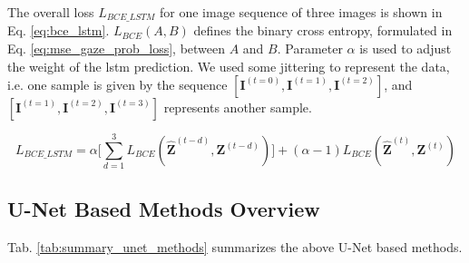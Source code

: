 The overall loss $L_{BCE\_LSTM}$ for one image sequence of three images is shown in Eq. \ref{eq:bce_lstm}.
$L_{BCE}(A,B)$ defines the binary cross entropy, formulated in Eq. \ref{eq:mse_gaze_prob_loss}, between $A$ and $B$.
Parameter $\alpha$ is used to adjust the weight of the \gls{lstm} prediction.
We used some jittering to represent the data, i.e. one sample is given by the sequence $[\boldsymbol{I}^{(t=0)}, \boldsymbol{I}^{(t=1)}, \boldsymbol{I}^{(t=2)}]$, and $[\boldsymbol{I}^{(t=1)}, \boldsymbol{I}^{(t=2)}, \boldsymbol{I}^{(t=3)}]$ represents another sample.

\begin{equation}
L_{BCE\_LSTM} = \alpha \Big[\sum_{d=1}^3 L_{BCE}(\boldsymbol{\hat{Z}}^{(t-d)}, \boldsymbol{Z}^{(t-d)})\Big] + (\alpha - 1) L_{BCE}(\boldsymbol{\hat{Z}}^{(t)}, \boldsymbol{Z}^{(t)})
\label{eq:bce_lstm}
\end{equation}

\subsection{U-Net Based Methods Overview}
Tab. \ref{tab:summary_unet_methods} summarizes the above U-Net based methods.

